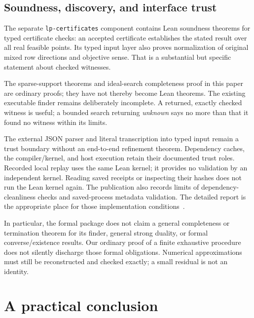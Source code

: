 \documentclass[11pt,letterpaper]{article}
\theoremstyle{definition}
\theoremstyle{remark}
\numberwithin{equation}{section}
\begin{document}
\subsection{Soundness, discovery, and interface trust}

The separate \texttt{lp-certificates} component contains Lean soundness
theorems for typed certificate checks: an accepted certificate establishes
the stated result over all real feasible points. Its typed input layer also
proves normalization of original mixed row directions and objective sense.
That is a substantial but specific statement about checked witnesses.

The sparse-support theorems and ideal-search completeness proof in this
paper are ordinary proofs; they have not thereby become Lean theorems.
The existing executable finder remains deliberately incomplete.
A returned, exactly checked witness is useful; a bounded search returning
\emph{unknown} says no more than that it found no witness within its limits.

The external JSON parser and literal transcription into typed input remain
a trust boundary without an end-to-end refinement theorem.
Dependency caches, the compiler/kernel, and host execution retain their
documented trust roles. Recorded local replay uses the same Lean kernel;
it provides no validation by an independent kernel.
Reading saved receipts or inspecting their hashes
does not run the Lean kernel again. The publication also records limits of
dependency-cleanliness checks and saved-process metadata validation.
The detailed report is the appropriate place for those implementation
conditions~\cite{round,toolkit}.

In particular, the formal package does not claim a general completeness or
termination theorem for its finder, general strong duality, or formal
converse/existence results. Our ordinary proof of a finite exhaustive
procedure does not silently discharge those formal obligations.
Numerical approximations must still be reconstructed and checked exactly;
a small residual is not an identity.

\section{A practical conclusion}
\end{document}
